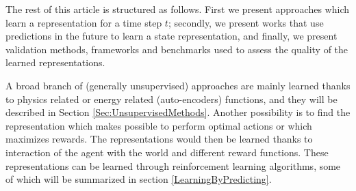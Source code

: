 \documentclass[a4paper]{article}
\begin{document}
The rest of this article is structured as follows. First we present approaches which learn a representation for a time step $t$; secondly, we present works that use predictions in the future to learn a state representation, and finally, we present validation methods, frameworks and benchmarks used to assess the quality of the learned representations.

A broad branch of (generally unsupervised) approaches are mainly learned thanks to physics related or energy related (auto-encoders) functions, and they will be described in Section \ref{Sec:UnsupervisedMethods}.  Another possibility is to find the representation which makes possible to perform optimal actions or which maximizes rewards. The representations would then be learned thanks to interaction of the agent with the world and different reward functions. These representations can be learned through reinforcement learning algorithms, some of which will be summarized in section \ref{LearningByPredicting}. %


\end{document}
